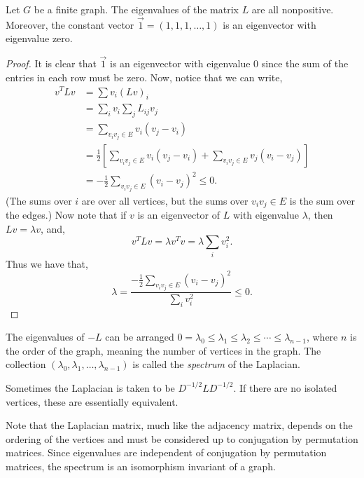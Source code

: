 \begin{theorem}
Let \(G\) be a finite graph.
The eigenvalues of the matrix \(L\) are all nonpositive.
Moreover, the constant vector \(\vec{1}=\left(  1,1,1,\ldots,1\right)\) is an eigenvector with eigenvalue zero.
\end{theorem}

\begin{proof}
It is clear that \(\vec{1}\) is an eigenvector with eigenvalue \(0\) since the sum of the entries in each row must be zero.
Now, notice that we can write,
%
\begin{align*}
v^{T}Lv  &  =\sum v_{i}{\left(  Lv\right)}_{i}\\
&  =\sum_{i}v_{i}\sum_{j}L_{ij}v_{j}\\
&  =\sum_{v_{i}v_{j}\in E}v_{i}\left(  v_{j}-v_{i}\right) \\
&  =\frac{1}{2}\left[  \sum_{v_{i}v_{j}\in E}v_{i}\left(  v_{j}-v_{i}\right)
+\sum_{v_{i}v_{j}\in E}v_{j}\left(  v_{i}-v_{j}\right)  \right] \\
&  =-\frac{1}{2}\sum_{v_{i}v_{j}\in E}{\left(  v_{i}-v_{j}\right)}^{2}\leq0.
\end{align*}
%
(The sums over \(i\) are over all vertices, but the sums over \(v_{i}v_{j}\in E\) is the sum over the edges.)
Now note that if \(v\) is an eigenvector of \(L\) with eigenvalue \(\lambda\), then \(Lv=\lambda v\), and,
\[
v^{T}Lv=\lambda v^{T}v=\lambda\sum_{i}v_{i}^{2}.
\]
Thus we have that,
\[
\lambda=\frac{-\frac{1}{2}\sum_{v_{i}v_{j}\in E}\left(v_{i}-v_{j}\right)
^{2}}{\sum_{i}v_{i}^{2}}\leq0.
\]

\end{proof}

\begin{definition}
The eigenvalues of \(-L\) can be arranged \(0=\lambda_{0}\leq\lambda_{1}\leq\lambda_{2}\leq\cdots\leq\lambda_{n-1}\), where \(n\) is the order of the graph, meaning the number of vertices in the graph. 
The collection \(\left(  \lambda_{0},\lambda_{1},\ldots,\lambda_{n-1}\right)\) is called the \emph{spectrum }of the Laplacian.
\end{definition}

\begin{remark}
Sometimes the Laplacian is taken to be \(D^{-1/2}LD^{-1/2}\).
If there are no isolated vertices, these are essentially equivalent.
\end{remark}

\begin{remark}
Note that the Laplacian matrix, much like the adjacency matrix, depends on the ordering of the vertices and must be considered up to conjugation by permutation matrices.
Since eigenvalues are independent of conjugation by permutation matrices, the spectrum is an isomorphism invariant of a graph.
\end{remark}

